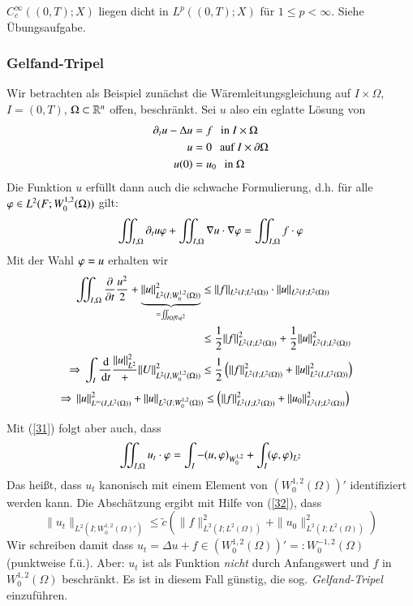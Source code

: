 \begin{remark}
    $C_c^\infty((0,T);X)$ liegen dicht in $L^p((0,T); X)$ für $1\leq p < \infty$. Siehe Übungsaufgabe.
\end{remark}

\subsubsection*{Gelfand-Tripel}
Wir betrachten als Beispiel zunächst die Wäremleitungsgleichung auf $I\times \Omega$, $I=(0,T)$,
$\Omega\subset \mathbb{R}^n$ offen, beschränkt. Sei $u$ also ein eglatte Lösung von
\begin{align*}
    \partial_t u - \Delta u &= f\hspace{.25cm} \text{in } I\times \Omega\\
    u&= 0 \hspace{.25cm} \text{auf } I\times \partial \Omega\\
    u(0)&=u_0 \hspace{.25cm} \text{in } \Omega
\end{align*}
Die Funktion $u$ erfüllt dann auch die schwache Formulierung, d.h. für alle $\varphi \in L^2(F; W_0^{1,2}
(\Omega))$ gilt:
\begin{align}\label{31}
    \iint_{I,\Omega} \partial_t u \varphi + \iint_{I,\Omega} \nabla u \cdot \nabla \varphi = \iint_{I,\Omega}
    f\cdot \varphi
\end{align}
Mit der Wahl $\varphi=u$ erhalten wir
\begin{align*}
    \iint_{I,\Omega} \frac{\partial}{\partial t}\frac{u^2}2 + \underbrace{\|u\|
    _{L^2(I;W_0^{1,2}(\Omega))}^2}_{=\iint_{I\Omega |\nabla u |^2}} &\leq \|f\|_{L^2(I;L^2(\Omega))}
    \cdot \|u\|_{L^2(I;L^2(\Omega))}\\
    &\leq \frac 12 \|f\|^2_{L^2(I;L^2(\Omega))} + \frac12 \|u\|^2_{L^2(I;L^2(\Omega))}\\
    \Rightarrow \, \int_I\frac{\, \mathrm{d}}{\, \mathrm{d} t} \frac{\|u\|_{L^2}^2} + \|U\|^2_{L^2(I,W_0^{1,2}(\Omega))}
    &\leq \frac 12 \left( \|f\|^2_{L^2(I;L^2(\Omega))} + \|u\|^2_{L^2(I,L^2(\Omega))}\right)
\end{align*}
\begin{align}\label{32}
    \Rightarrow \, \|u\|^2_{L^\infty(I,L^2(\Omega))}+\|u\|_{L^2(I;W_0^{1,2}(\Omega))} &\leq \left( \|f\|^2
    _{L^2(I;L^2(\Omega))} + \|u_0\|^2_{L^2(I;L^2(\Omega))} \right)
\end{align}

Mit (\ref{31}) folgt aber auch, dass
\[
    \iint_{I,\Omega} u_t\cdot \varphi = \int_I -(u,\varphi)_{W_0^{1,2}} + \int_I(\varphi,\varphi)_{L^2} 
\]
Das heißt, dass $u_t$ kanonisch mit einem Element von $(W_0^{1,2}(\Omega))'$ identifiziert werden kann.
Die Abschätzung ergibt mit Hilfe von (\ref{32}), dass
\[
    \|u_t\|_{L^2(I;W_0^{1,2}(\Omega)')} \leq \tilde c (\|f\|^2_{L^2(I;L^2(\Omega))} + \|u_0\|^2
    _{L^2(I;L^2(\Omega))}   )  
\]
Wir schreiben damit dass $u_t=\Delta u + f \in (W^{1,2}_0(\Omega))'=:W^{-1,2}_0(\Omega)$
(punktweise f.ü.). Aber: $u_t$ ist als Funktion \textit{nicht} durch Anfangswert und $f$ in
$W_0^{1,2}(\Omega)$ beschränkt.
Es ist in diesem Fall günstig, die sog. \textit{Gelfand-Tripel} einzuführen.

